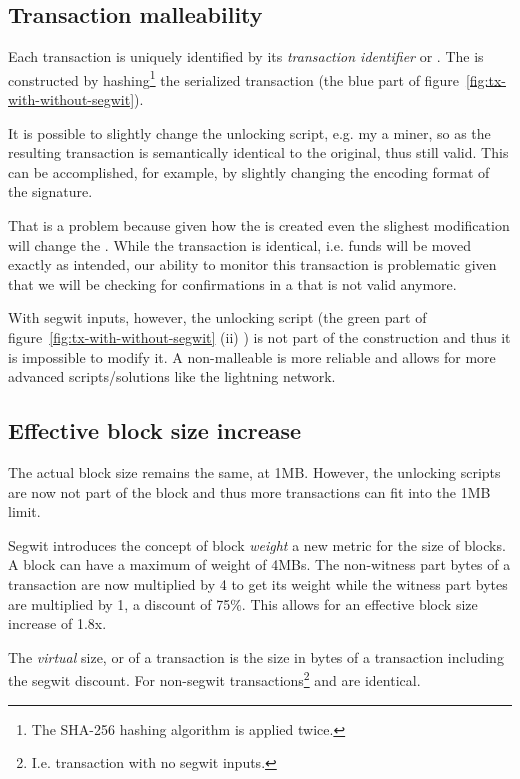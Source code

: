 \subsection*{Transaction malleability}
Each transaction is uniquely identified by its \emph{transaction identifier} or . The  is constructed by hashing\footnote{The SHA-256 hashing algorithm is applied twice.} the serialized transaction (the blue part of figure~\ref{fig:tx-with-without-segwit}).

It is possible to slightly change the unlocking script, e.g. my a miner,  so as the resulting transaction is semantically identical to the original, thus still valid. This can be accomplished, for example, by slightly changing the encoding format of the signature.

That is a problem because given how the  is created even the slighest modification will change the . While the transaction is identical, i.e. funds will be moved exactly as intended, our ability to monitor this transaction is problematic given that we will be checking for confirmations in a  that is not valid anymore.

With segwit inputs, however, the unlocking script (the green part of figure~\ref{fig:tx-with-without-segwit} (ii) ) is not part of the  construction and thus it is impossible to modify it. A non-malleable  is more reliable and allows for more advanced scripts/solutions like the lightning network.


\subsection*{Effective block size increase}
The actual block size remains the same, at 1MB. However, the unlocking scripts are now not part of the block and thus more transactions can fit into the 1MB limit.

Segwit introduces the concept of block \emph{weight} a new metric for the size of blocks. A block can have a maximum of weight of 4MBs. The non-witness part bytes of a transaction are now multiplied by 4 to get its weight while the witness part bytes are multiplied by 1, a discount of 75\%. This allows for an effective block size increase of 1.8x.

The \emph{virtual} size, or  of a transaction is the size in bytes of a transaction including the segwit discount. For non-segwit transactions\footnote{I.e. transaction with no segwit inputs.}  and  are identical.


